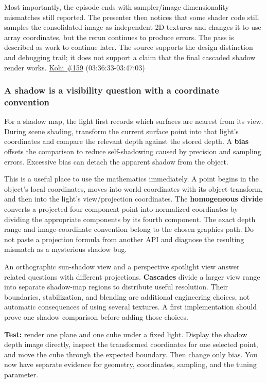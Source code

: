 Most importantly, the episode ends with sampler/image dimensionality mismatches still reported. The presenter then notices that some shader code still samples the consolidated image as independent 2D textures and changes it to use array coordinates, but the rerun continues to produce errors. The pass is described as work to continue later. The source supports the design distinction and debugging trail; it does not support a claim that the final cascaded shadow render works. \href{https://www.youtube.com/watch?v=FrtHF-9K1HI}{Kohi \#159} (03:36:33-03:47:03)

\subsubsection{A shadow is a visibility question with a coordinate convention}\label{06-engine-ii-ch026-a-shadow-is-a-visibility-question-with-a-coordinate-convention}

For a shadow map, the light first records which surfaces are nearest from its view. During scene shading, transform the current surface point into that light's coordinates and compare the relevant depth against the stored depth. A \textbf{bias} offsets the comparison to reduce self-shadowing caused by precision and sampling errors. Excessive bias can detach the apparent shadow from the object.

This is a useful place to use the mathematics immediately. A point begins in the object's local coordinates, moves into world coordinates with its object transform, and then into the light's view/projection coordinates. The \textbf{homogeneous divide} converts a projected four-component point into normalized coordinates by dividing the appropriate components by its fourth component. The exact depth range and image-coordinate convention belong to the chosen graphics path. Do not paste a projection formula from another API and diagnose the resulting mismatch as a mysterious shadow bug.

An orthographic sun-shadow view and a perspective spotlight view answer related questions with different projections. \textbf{Cascades} divide a larger view range into separate shadow-map regions to distribute useful resolution. Their boundaries, stabilization, and blending are additional engineering choices, not automatic consequences of using several textures. A first implementation should prove one shadow comparison before adding those choices.

\textbf{Test:} render one plane and one cube under a fixed light. Display the shadow depth image directly, inspect the transformed coordinates for one selected point, and move the cube through the expected boundary. Then change only bias. You now have separate evidence for geometry, coordinates, sampling, and the tuning parameter.

